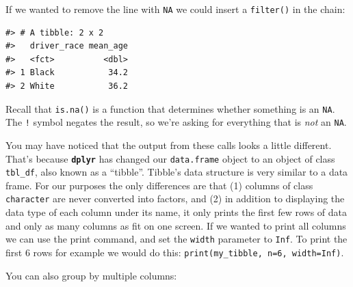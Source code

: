 \documentclass[]{book}
\newenvironment{Shaded}{\begin{snugshade}}{\end{snugshade}}
\newcommand{\DataTypeTok}[1]{\textcolor[rgb]{0.13,0.29,0.53}{#1}}
\newcommand{\KeywordTok}[1]{\textcolor[rgb]{0.13,0.29,0.53}{\textbf{#1}}}
\newcommand{\NormalTok}[1]{#1}
\newcommand{\OperatorTok}[1]{\textcolor[rgb]{0.81,0.36,0.00}{\textbf{#1}}}
\newcommand{\OtherTok}[1]{\textcolor[rgb]{0.56,0.35,0.01}{#1}}
\newcommand{\StringTok}[1]{\textcolor[rgb]{0.31,0.60,0.02}{#1}}
\begin{document}
If we wanted to remove the line with \texttt{NA} we could insert a \texttt{filter()} in the chain:

\begin{Shaded}
\end{Shaded}

\begin{verbatim}
#> # A tibble: 2 x 2
#>   driver_race mean_age
#>   <fct>          <dbl>
#> 1 Black           34.2
#> 2 White           36.2
\end{verbatim}

Recall that \texttt{is.na()} is a function that determines whether something is an \texttt{NA}. The \texttt{!} symbol negates the result, so we're asking for everything that is \emph{not} an \texttt{NA}.

You may have noticed that the output from these calls looks a little different. That's because \textbf{\texttt{dplyr}} has changed our \texttt{data.frame} object
to an object of class \texttt{tbl\_df}, also known as a ``tibble''. Tibble's data
structure is very similar to a data frame. For our purposes the only differences
are that (1) columns of class \texttt{character} are never converted into
factors, and (2) in addition to displaying the data type of each column under its name, it only prints the first few rows of data and only as many columns as fit on one screen. If we wanted to print all columns we can use the print command, and set the \texttt{width} parameter to \texttt{Inf}. To print the first 6 rows for example we would do this: \texttt{print(my\_tibble,\ n=6,\ width=Inf)}.

You can also group by multiple columns:

\begin{Shaded}
\end{Shaded}
\end{document}
